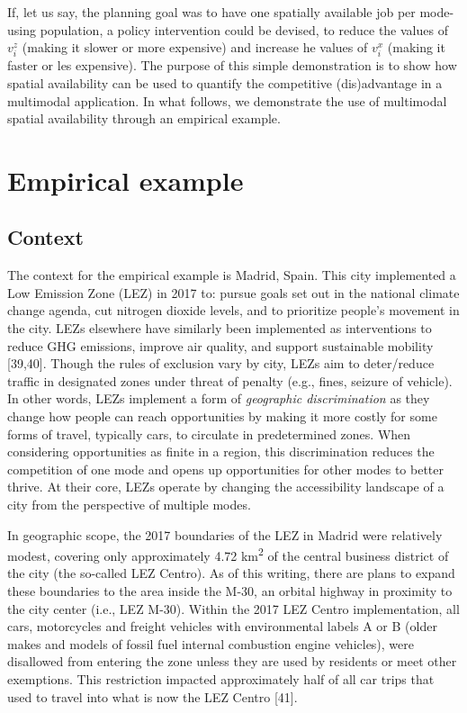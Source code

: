 \documentclass[10pt,letterpaper]{article}
\begin{document}
If, let us say, the planning goal was to have one spatially available
job per mode-using population, a policy intervention could be devised,
to reduce the values of \(v_i^z\) (making it slower or more expensive)
and increase he values of \(v_i^x\) (making it faster or les expensive).
The purpose of this simple demonstration is to show how spatial
availability can be used to quantify the competitive (dis)advantage in a
multimodal application. In what follows, we demonstrate the use of
multimodal spatial availability through an empirical example.

\hypertarget{empirical-example}{%
\section{Empirical example}\label{empirical-example}}

\hypertarget{context}{%
\subsection{Context}\label{context}}

The context for the empirical example is Madrid, Spain. This city
implemented a Low Emission Zone (LEZ) in 2017 to: pursue goals set out
in the national climate change agenda, cut nitrogen dioxide levels, and
to prioritize people's movement in the city. LEZs elsewhere have
similarly been implemented as interventions to reduce GHG emissions,
improve air quality, and support sustainable mobility {[}39,40{]}.
Though the rules of exclusion vary by city, LEZs aim to deter/reduce
traffic in designated zones under threat of penalty (e.g., fines,
seizure of vehicle). In other words, LEZs implement a form of
\emph{geographic discrimination} as they change how people can reach
opportunities by making it more costly for some forms of travel,
typically cars, to circulate in predetermined zones. When considering
opportunities as finite in a region, this discrimination reduces the
competition of one mode and opens up opportunities for other modes to
better thrive. At their core, LEZs operate by changing the accessibility
landscape of a city from the perspective of multiple modes.

In geographic scope, the 2017 boundaries of the LEZ in Madrid were
relatively modest, covering only approximately 4.72
km\textsuperscript{2} of the central business district of the city (the
so-called LEZ Centro). As of this writing, there are plans to expand
these boundaries to the area inside the M-30, an orbital highway in
proximity to the city center (i.e., LEZ M-30). Within the 2017 LEZ
Centro implementation, all cars, motorcycles and freight vehicles with
environmental labels A or B (older makes and models of fossil fuel
internal combustion engine vehicles), were disallowed from entering the
zone unless they are used by residents or meet other exemptions. This
restriction impacted approximately half of all car trips that used to
travel into what is now the LEZ Centro {[}41{]}.
\end{document}
